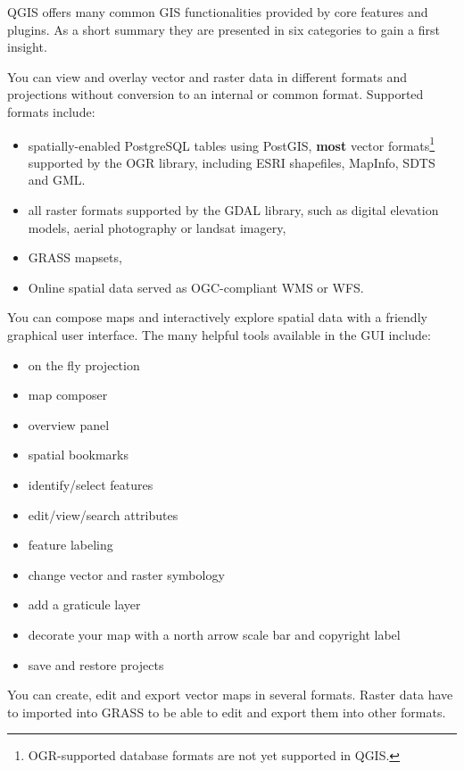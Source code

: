 QGIS offers many common GIS functionalities provided by core features and
plugins. As a short summary they are presented in six categories to gain a
first insight.


You can view and overlay vector and raster data in different formats and
projections without conversion to an internal or common format. Supported
formats include:

\begin{itemize}
\item spatially-enabled PostgreSQL tables using PostGIS, \textbf{most} vector
formats\footnote{OGR-supported database formats are not yet supported in QGIS.}
supported by the OGR library, including ESRI shapefiles, MapInfo,
SDTS and GML.
\item all raster formats supported by the GDAL library, such as digital
elevation models, aerial photography or landsat imagery,
\item GRASS mapsets, 
\item Online spatial data served as OGC-compliant WMS or WFS.
\end{itemize}


You can compose maps and interactively explore spatial data with a friendly
graphical user interface. The many helpful tools available in the GUI include:

\begin{itemize}
\item on the fly projection
\item map composer
\item overview panel
\item spatial bookmarks
\item identify/select features
\item edit/view/search attributes
\item feature labeling
\item change vector and raster symbology
\item add a graticule layer
\item decorate your map with a north arrow scale bar and copyright label
\item save and restore projects
\end{itemize}


You can create, edit and export vector maps in several formats. Raster data
have to imported into GRASS to be able to edit and export them into other
formats.  

